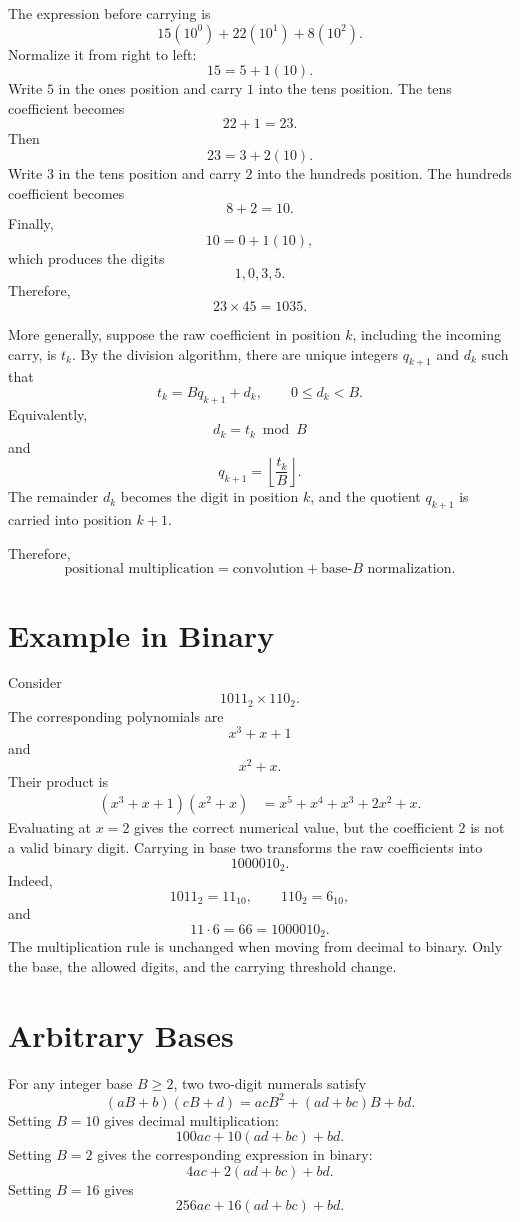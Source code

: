 \documentclass[11pt]{article}
\begin{document}
The expression before carrying is
\[
15(10^0)+22(10^1)+8(10^2).
\]
Normalize it from right to left:
\[
15=5+1(10).
\]
Write $5$ in the ones position and carry $1$ into the tens position. The tens coefficient becomes
\[
22+1=23.
\]
Then
\[
23=3+2(10).
\]
Write $3$ in the tens position and carry $2$ into the hundreds position. The hundreds coefficient becomes
\[
8+2=10.
\]
Finally,
\[
10=0+1(10),
\]
which produces the digits
\[
1,0,3,5.
\]
Therefore,
\[
23\times45=1035.
\]

More generally, suppose the raw coefficient in position $k$, including the incoming carry, is $t_k$. By the division algorithm, there are unique integers $q_{k+1}$ and $d_k$ such that
\[
t_k=Bq_{k+1}+d_k,
\qquad
0\le d_k<B.
\]
Equivalently,
\[
d_k=t_k\bmod B
\]
and
\[
q_{k+1}=\left\lfloor\frac{t_k}{B}\right\rfloor.
\]
The remainder $d_k$ becomes the digit in position $k$, and the quotient $q_{k+1}$ is carried into position $k+1$.

Therefore,
\[
\boxed{
\text{positional multiplication}
=
\text{convolution}
+
\text{base-}B\text{ normalization}
}.
\]

\section{Example in Binary}

Consider
\[
1011_2\times110_2.
\]
The corresponding polynomials are
\[
x^3+x+1
\]
and
\[
x^2+x.
\]
Their product is
\begin{align*}
(x^3+x+1)(x^2+x)
&=x^5+x^4+x^3+2x^2+x.
\end{align*}
Evaluating at $x=2$ gives the correct numerical value, but the coefficient $2$ is not a valid binary digit. Carrying in base two transforms the raw coefficients into
\[
1000010_2.
\]
Indeed,
\[
1011_2=11_{10},
\qquad
110_2=6_{10},
\]
and
\[
11\cdot6=66=1000010_2.
\]
The multiplication rule is unchanged when moving from decimal to binary. Only the base, the allowed digits, and the carrying threshold change.

\section{Arbitrary Bases}

For any integer base $B\ge 2$, two two-digit numerals satisfy
\[
(aB+b)(cB+d)=acB^2+(ad+bc)B+bd.
\]
Setting $B=10$ gives decimal multiplication:
\[
100ac+10(ad+bc)+bd.
\]
Setting $B=2$ gives the corresponding expression in binary:
\[
4ac+2(ad+bc)+bd.
\]
Setting $B=16$ gives
\[
256ac+16(ad+bc)+bd.
\]
\end{document}
